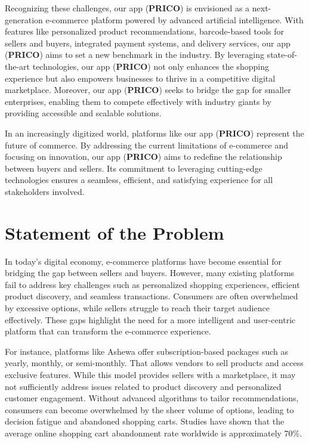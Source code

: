 \documentclass[12pt]{report}
\begin{document}
Recognizing these challenges, our app (\textbf{PRICO}) is envisioned as a next-generation
e-commerce platform powered by advanced artificial intelligence. With features like
personalized product recommendations, barcode-based tools for sellers and buyers, integrated
payment systems, and delivery services, our app (\textbf{PRICO}) aims to set a new benchmark in
the industry. By leveraging state-of-the-art technologies, our app (\textbf{PRICO}) not only enhances
the shopping experience but also empowers businesses to thrive in a competitive digital
marketplace. Moreover, our app (\textbf{PRICO}) seeks to bridge the gap for smaller enterprises,
enabling them to compete effectively with industry giants by providing accessible and
scalable solutions. \cite{c1}\cite{c4}

In an increasingly digitized world, platforms like our app (\textbf{PRICO}) represent the future of
commerce. By addressing the current limitations of e-commerce and focusing on innovation,
our app (\textbf{PRICO}) aims to redefine the relationship between buyers and sellers. Its
commitment to leveraging cutting-edge technologies ensures a seamless, efficient, and
satisfying experience for all stakeholders involved. \cite{c2}\cite{c5}

\section{Statement of the Problem}

In today's digital economy, e-commerce platforms have become essential for bridging the gap
between sellers and buyers. However, many existing platforms fail to address key challenges
such as personalized shopping experiences, efficient product discovery, and seamless
transactions. Consumers are often overwhelmed by excessive options, while sellers struggle
to reach their target audience effectively. These gaps highlight the need for a more intelligent
and user-centric platform that can transform the e-commerce experience.

For instance, platforms like Ashewa offer subscription-based packages such as yearly,
monthly, or semi-monthly. That allows vendors to sell products and access exclusive features.
While this model provides sellers with a marketplace, it may not sufficiently address issues
related to product discovery and personalized customer engagement. Without advanced
algorithms to tailor recommendations, consumers can become overwhelmed by the sheer
volume of options, leading to decision fatigue and abandoned shopping carts. Studies have
shown that the average online shopping cart abandonment rate worldwide is approximately
70\%.\cite{c6}
\end{document}
